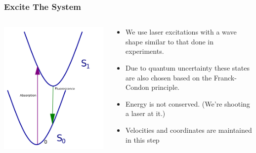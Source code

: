 \documentclass{beamer}
\begin{document}
\begin{frame}
  \frametitle{Excite The System}
\begin{columns}[c]
  \includegraphics[width=\textwidth]{Images/abs_chart_mirror}
  \begin{block}{}
    \begin{itemize}
    \item We use laser excitations with a wave shape similar to that done in experiments.
    \item Due to quantum uncertainty these states are also chosen based on the Franck-Condon principle.
    \item Energy is not conserved. (We're shooting a laser at it.)
    \item Velocities and coordinates are maintained in this step
    \end{itemize}
  \end{block}
\end{columns}
\end{frame}
\end{document}
